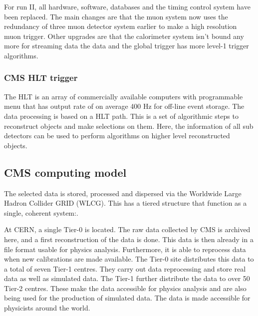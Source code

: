 For run II, all hardware, software, databases and the timing control system have been replaced. The main changes are that the muon system now uses the redundancy of three muon detector system earlier to make a high resolution muon trigger. Other upgrades are that the calorimeter system isn't bound any more for streaming data the data and the global trigger has more level-1 trigger algorithms. 

\subsubsection*{CMS HLT trigger}
The HLT is an array of commercially available computers with programmable menu that has output rate of on average 400 \si{ \hertz} for off-line event storage.
The data processing is based on a HLT path. This is a  set of algorithmic steps to reconstruct objects and make selections on them.  Here, the information of all sub detectors can be used to perform algorithms on higher level reconstructed objects. 
\subsection{CMS computing model}
The selected data is stored, processed and dispersed via the Worldwide Large Hadron Collider GRID (WLCG)\cite{Grandi:814248,Eck:840543}. This has a tiered structure that function as a single, coherent system:. 

At CERN, a single Tier-0 is located. The raw data collected by CMS is archived here, and a first reconstruction of the data is done. This data is then already in a file format usable for physics analysis. Furthermore, it is able to reprocess data when new calibrations are made available. The Tier-0 site distributes this data to a total of seven Tier-1 centres. They carry out data reprocessing and store real data as well as simulated  data. The Tier-1 further distribute the data to over 50 Tier-2 centres. These make the data accessible for physics analysis and are also being used for the production of simulated data. The data is made accessible for  physicists around the world. 
